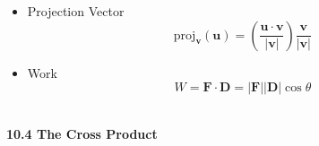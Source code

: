 \documentclass[12pt]{article}
\renewcommand{\vec}[1]{\mathbf{#1}}
\newcommand{\proj}{\textrm{proj}}
\newcommand{\<}{\left<}
\renewcommand{\>}{\right>}
\begin{document}
\begin{itemize}
    \item Projection Vector
      \[\proj_{\vec{v}}(\vec{u}) = \left(\frac{\vec{u}\cdot\vec{v}}{|\vec{v}|} \right)\frac{\vec{v}}{|\vec{v}|}\]

    \item Work
      \[W = \vec{F} \cdot \vec{D} = |\vec{F}||\vec{D}|\cos \theta\]\
    
    \end{itemize}
  
\newpage

\centerline{\bf 10.4 The Cross Product}
  
\end{document}

